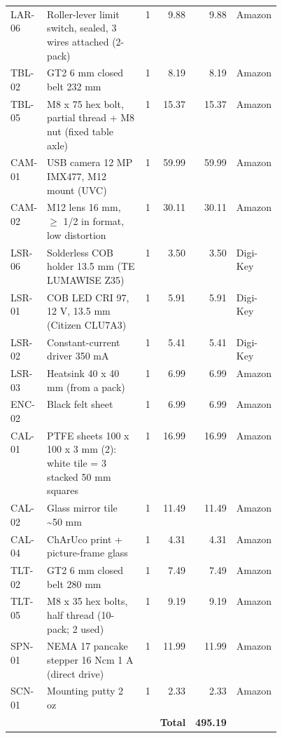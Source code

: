 \begin{tabular}{lp{0.45\linewidth}rrrl}
LAR-06 & Roller-lever limit switch, sealed, 3 wires attached (2-pack) & 1 & 9.88 & 9.88 & Amazon \\
TBL-02 & GT2 6 mm closed belt 232 mm & 1 & 8.19 & 8.19 & Amazon \\
TBL-05 & M8 x 75 hex bolt, partial thread + M8 nut (fixed table axle) & 1 & 15.37 & 15.37 & Amazon \\
CAM-01 & USB camera 12 MP IMX477, M12 mount (UVC) & 1 & 59.99 & 59.99 & Amazon \\
CAM-02 & M12 lens 16 mm, $\geq$ 1/2 in format, low distortion & 1 & 30.11 & 30.11 & Amazon \\
LSR-06 & Solderless COB holder 13.5 mm (TE LUMAWISE Z35) & 1 & 3.50 & 3.50 & Digi-Key \\
LSR-01 & COB LED CRI 97, 12 V, 13.5 mm (Citizen CLU7A3) & 1 & 5.91 & 5.91 & Digi-Key \\
LSR-02 & Constant-current driver 350 mA & 1 & 5.41 & 5.41 & Digi-Key \\
LSR-03 & Heatsink 40 x 40 mm (from a pack) & 1 & 6.99 & 6.99 & Amazon \\
ENC-02 & Black felt sheet & 1 & 6.99 & 6.99 & Amazon \\
CAL-01 & PTFE sheets 100 x 100 x 3 mm (2): white tile = 3 stacked 50 mm squares & 1 & 16.99 & 16.99 & Amazon \\
CAL-02 & Glass mirror tile \textasciitilde{}50 mm & 1 & 11.49 & 11.49 & Amazon \\
CAL-04 & ChArUco print + picture-frame glass & 1 & 4.31 & 4.31 & Amazon \\
TLT-02 & GT2 6 mm closed belt 280 mm & 1 & 7.49 & 7.49 & Amazon \\
TLT-05 & M8 x 35 hex bolts, half thread (10-pack; 2 used) & 1 & 9.19 & 9.19 & Amazon \\
SPN-01 & NEMA 17 pancake stepper 16 Ncm 1 A (direct drive) & 1 & 11.99 & 11.99 & Amazon \\
SCN-01 & Mounting putty 2 oz & 1 & 2.33 & 2.33 & Amazon \\
 & & & \textbf{Total} & \textbf{495.19} &  \\ 
\end{tabular}
